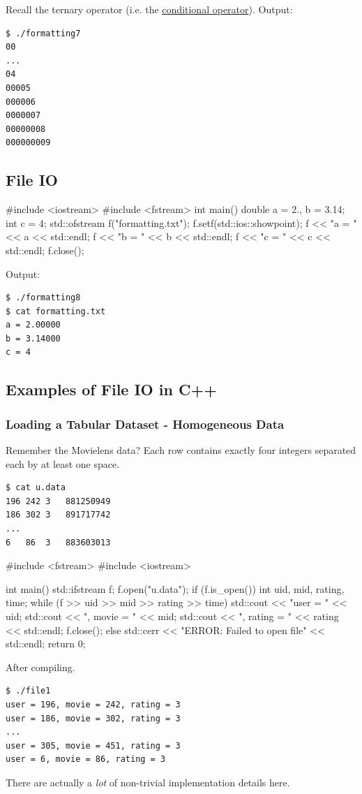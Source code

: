 \documentclass[12pt,letterpaper,twoside]{article}
\begin{document}
Recall the ternary operator (i.e. the 
\href{https://en.cppreference.com/w/cpp/language/operator_other}{conditional operator}). 
Output:

\begin{verbatim}
$ ./formatting7
00
...
04
00005
000006
0000007
00000008
000000009
\end{verbatim}

\subsection{File IO}

\begin{cpp}
#include <iostream>
#include <fstream>
int main() {
  double a = 2., b = 3.14;
  int c = 4;
  std::ofstream f("formatting.txt");
  f.setf(std::ios::showpoint);
  f << "a = " << a << std::endl;
  f << "b = " << b << std::endl;
  f << "c = " << c << std::endl;
  f.close();
}
\end{cpp}

Output:

\begin{verbatim}
$ ./formatting8
$ cat formatting.txt
a = 2.00000
b = 3.14000
c = 4
\end{verbatim}

\subsection{Examples of File IO in C++}
\subsubsection{Loading a Tabular Dataset - Homogeneous Data}
Remember the Movielens data? Each row contains exactly four integers separated each by 
at least one space. 

\begin{verbatim}
$ cat u.data
196 242 3   881250949
186 302 3   891717742
...
6   86  3   883603013
\end{verbatim}

\begin{cpp}
#include <fstream>
#include <iostream>

int main() {
  std::ifstream f;
  f.open("u.data");
  if (f.is_open()) {
    int uid, mid, rating, time;
    while (f >> uid >> mid >> rating >> time) {
      std::cout << "user = "     << uid;
      std::cout << ", movie = "  << mid;
      std::cout << ", rating = " << rating << std::endl;
    }
    f.close();
  }
  else {
    std::cerr << "ERROR: Failed to open file" << std::endl;
  }
  return 0;
}
\end{cpp}
After compiling.
\begin{verbatim}
$ ./file1
user = 196, movie = 242, rating = 3
user = 186, movie = 302, rating = 3
...
user = 305, movie = 451, rating = 3
user = 6, movie = 86, rating = 3
\end{verbatim}
There are actually a \emph{lot} of non-trivial implementation details here.
\end{document}

